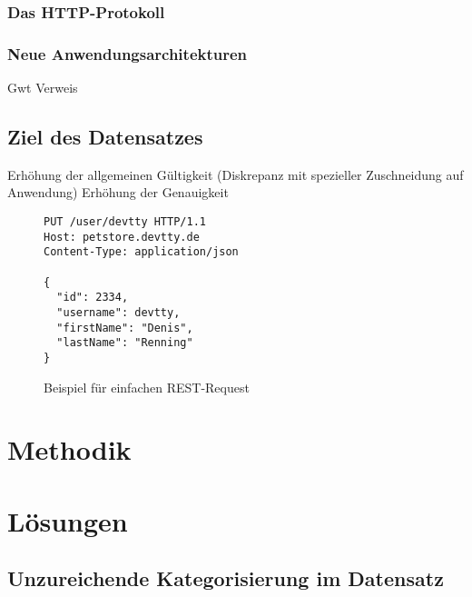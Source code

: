 \subsubsection{Das HTTP-Protokoll}

\subsubsection{Neue Anwendungsarchitekturen}

Gwt Verweis\cite{kozik2019}

\subsection{Ziel des Datensatzes}

Erhöhung der allgemeinen Gültigkeit (Diskrepanz mit spezieller Zuschneidung auf Anwendung)
Erhöhung der Genauigkeit


      \begin{figure}
        \caption{Beispiel für einfachen REST-Request}
        \label{fig:restputexample}
      \begin{lstlisting}
PUT /user/devtty HTTP/1.1
Host: petstore.devtty.de
Content-Type: application/json

{
  "id": 2334,
  "username": devtty,
  "firstName": "Denis",
  "lastName": "Renning"
}
\end{lstlisting}
\end{figure}



\section{Methodik}


\section{Lösungen}

\subsection{Unzureichende Kategorisierung im Datensatz}

